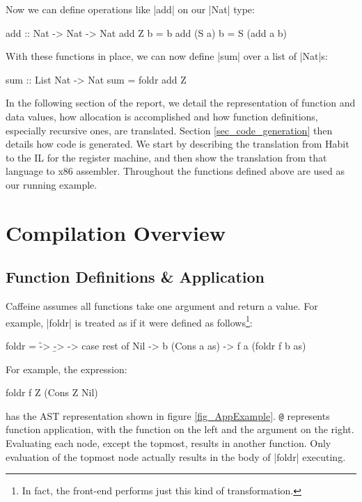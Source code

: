 \documentclass[11pt]{article}
\begin{document}
\noindent
Now we can define operations like |add| on our |Nat| type:

\begin{code}
  add :: Nat -> Nat -> Nat
  add Z b      = b
  add (S a) b  = S (add a b)
\end{code}

\noindent
With these functions in place, we can now define |sum| over a list of
|Nat|s:

\begin{code}
  sum :: List Nat -> Nat
  sum = foldr add Z
\end{code}

In the following section of the report, we detail the representation
of function and data values, how allocation is accomplished and how
function definitions, especially recursive ones, are
translated. Section \ref{sec_code_generation} then details how code is
generated. We start by describing the translation from Habit to the IL
for the register machine, and then show the
translation from that language to x86 assembler. Throughout the
functions defined above are used as our running example.

\section{Compilation Overview}

\subsection{Function Definitions \& Application}
\label{subsec_function}
Caffeine assumes all functions take one argument and return a
value. For example, |foldr| is treated as if it were defined as
follows\footnote{In fact, the front-end performs just this kind of
  transformation.}:

\begin{code}
  foldr = \f -> \b -> \rest -> 
    case rest of
        Nil          -> b
        (Cons a as)  -> f a (foldr f b as)
\end{code}

For example, the expression:

\begin{code}
foldr f Z (Cons Z Nil)
\end{code}

\noindent
has the AST representation shown in figure
\ref{fig_AppExample}. \verb=@= represents function application, with the function
on the left and the argument on the right. Evaluating each node, except the
topmost, results in another function. Only evaluation of the topmost
node actually results in the body of |foldr| executing. 
\end{document}
